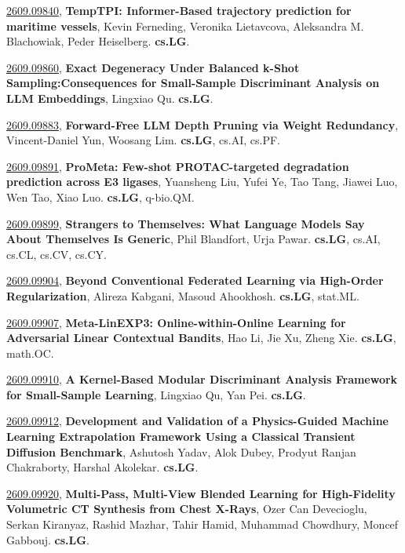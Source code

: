 \documentclass[9pt, a4paper]{article}
\theoremstyle{plain}
\theoremstyle{definition}
\theoremstyle{remark}
\newcommand{\arxivwithtarget}[3]{\hypertarget{#1}{}\href{https://arxiv.org/abs/#1}{#1}, \textbf{\textcolor{arxivblue}{#2}}, #3. }
\begin{document}
\arxivwithtarget{2609.09840}{TempTPI: Informer-Based trajectory prediction for maritime vessels}{Kevin Ferneding, Veronika Lietavcova, Aleksandra M. Blachowiak, Peder Heiselberg}\textbf{cs.LG}.



\arxivwithtarget{2609.09860}{Exact Degeneracy Under Balanced k-Shot Sampling:Consequences for Small-Sample Discriminant Analysis on LLM Embeddings}{Lingxiao Qu}\textbf{cs.LG}.



\arxivwithtarget{2609.09883}{Forward-Free LLM Depth Pruning via Weight Redundancy}{Vincent-Daniel Yun, Woosang Lim}\textbf{cs.LG}, cs.AI, cs.PF.



\arxivwithtarget{2609.09891}{ProMeta: Few-shot PROTAC-targeted degradation prediction across E3 ligases}{Yuansheng Liu, Yufei Ye, Tao Tang, Jiawei Luo, Wen Tao, Xiao Luo}\textbf{cs.LG}, q-bio.QM.



\arxivwithtarget{2609.09899}{Strangers to Themselves: What Language Models Say About Themselves Is Generic}{Phil Blandfort, Urja Pawar}\textbf{cs.LG}, cs.AI, cs.CL, cs.CV, cs.CY.



\arxivwithtarget{2609.09904}{Beyond Conventional Federated Learning via High-Order Regularization}{Alireza Kabgani, Masoud Ahookhosh}\textbf{cs.LG}, stat.ML.



\arxivwithtarget{2609.09907}{Meta-LinEXP3: Online-within-Online Learning for Adversarial Linear Contextual Bandits}{Hao Li, Jie Xu, Zheng Xie}\textbf{cs.LG}, math.OC.



\arxivwithtarget{2609.09910}{A Kernel-Based Modular Discriminant Analysis Framework for Small-Sample Learning}{Lingxiao Qu, Yan Pei}\textbf{cs.LG}.



\arxivwithtarget{2609.09912}{Development and Validation of a Physics-Guided Machine Learning Extrapolation Framework Using a Classical Transient Diffusion Benchmark}{Ashutosh Yadav, Alok Dubey, Prodyut Ranjan Chakraborty, Harshal Akolekar}\textbf{cs.LG}.



\arxivwithtarget{2609.09920}{Multi-Pass, Multi-View Blended Learning for High-Fidelity Volumetric CT Synthesis from Chest X-Rays}{Ozer Can Devecioglu, Serkan Kiranyaz, Rashid Mazhar, Tahir Hamid, Muhammad Chowdhury, Moncef Gabbouj}\textbf{cs.LG}.
\end{document}
